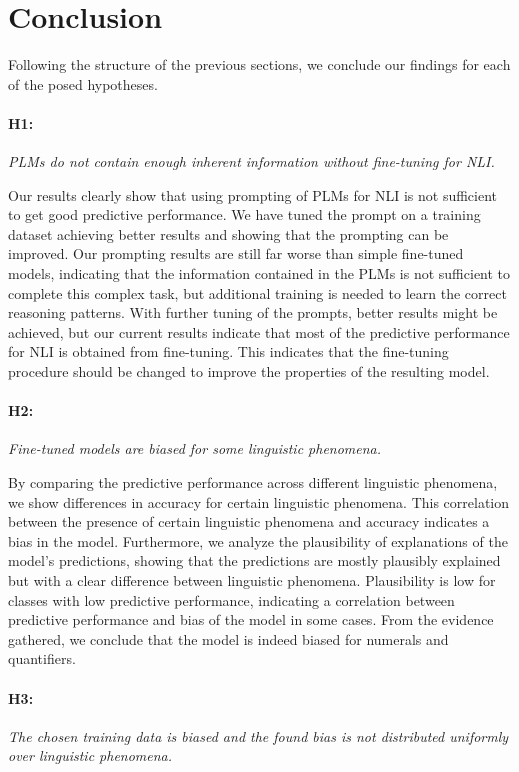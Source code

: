 \section{Conclusion} \label{sec:conclusion}
Following the structure of the previous sections, we conclude our findings for each of the posed hypotheses.

\paragraph{H1:} \textit{\acp{PLM} do not contain enough inherent information without fine-tuning for \ac{NLI}.}

Our results clearly show that using prompting of \acp{PLM} for \ac{NLI} is not sufficient to get good predictive performance. We have tuned the prompt on a training dataset achieving better results and showing that the prompting can be improved. Our prompting results are still far worse than simple fine-tuned models, indicating that the information contained in the \acp{PLM} is not sufficient to complete this complex task, but additional training is needed to learn the correct reasoning patterns. With further tuning of the prompts, better results might be achieved, but our current results indicate that most of the predictive performance for \ac{NLI} is obtained from fine-tuning. This indicates that the fine-tuning procedure should be changed to improve the properties of the resulting model.

\paragraph{H2:} \textit{Fine-tuned models are biased for some linguistic phenomena.}

By comparing the predictive performance across different linguistic phenomena, we show differences in accuracy for certain linguistic phenomena. This correlation between the presence of certain linguistic phenomena and accuracy indicates a bias in the model. Furthermore, we analyze the plausibility of explanations of the model's predictions, showing that the predictions are mostly plausibly explained but with a clear difference between linguistic phenomena. Plausibility is low for classes with low predictive performance, indicating a correlation between predictive performance and bias of the model in some cases. From the evidence gathered, we conclude that the model is indeed biased for numerals and quantifiers.

\paragraph{H3:} \textit{The chosen training data is biased and the found bias is not distributed uniformly over linguistic phenomena.}


